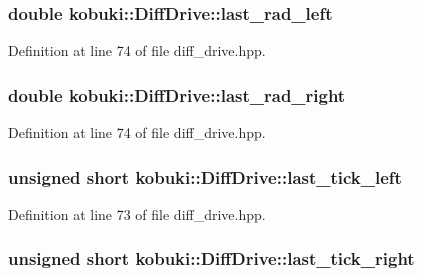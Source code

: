 \subsubsection[{last\-\_\-rad\-\_\-left}]{\setlength{\rightskip}{0pt plus 5cm}double {\bf kobuki\-::\-Diff\-Drive\-::last\-\_\-rad\-\_\-left}\hspace{0.3cm}{\ttfamily  [private]}}\label{classkobuki_1_1DiffDrive_a3a5f3a028bad67a5dac076e3fc9d8d22}


\-Definition at line 74 of file diff\-\_\-drive.\-hpp.

\subsubsection[{last\-\_\-rad\-\_\-right}]{\setlength{\rightskip}{0pt plus 5cm}double {\bf kobuki\-::\-Diff\-Drive\-::last\-\_\-rad\-\_\-right}\hspace{0.3cm}{\ttfamily  [private]}}\label{classkobuki_1_1DiffDrive_a799258e6537987af4f1e2a3d1750e9a3}


\-Definition at line 74 of file diff\-\_\-drive.\-hpp.

\subsubsection[{last\-\_\-tick\-\_\-left}]{\setlength{\rightskip}{0pt plus 5cm}unsigned short {\bf kobuki\-::\-Diff\-Drive\-::last\-\_\-tick\-\_\-left}\hspace{0.3cm}{\ttfamily  [private]}}\label{classkobuki_1_1DiffDrive_aae2baf5652d3cf5d17b9430df74460bc}


\-Definition at line 73 of file diff\-\_\-drive.\-hpp.

\subsubsection[{last\-\_\-tick\-\_\-right}]{\setlength{\rightskip}{0pt plus 5cm}unsigned short {\bf kobuki\-::\-Diff\-Drive\-::last\-\_\-tick\-\_\-right}\hspace{0.3cm}{\ttfamily  [private]}}\label{classkobuki_1_1DiffDrive_a5486e5f69560bf760c44893babcc03a4}


